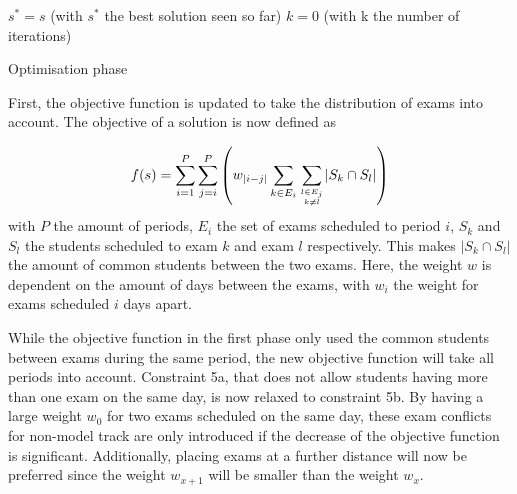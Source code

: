 \begin{algorithm}
 $s^* = s$ (with $s^*$ the best solution seen so far)\;
 $k = 0$ (with k the number of iterations)\;

\caption{Optimisation phase}
\label{alg:phase2}
\end{algorithm}


First, the objective function is updated to take the distribution of exams into account. The objective of a solution is now defined as

\begin{equation}
    f(s) = \sum_{i=1}^{P} \sum_{j=i}^{P}\left(w_{|i-j|} \sum_{k \in E_i}^{}\sum_{l \in E_j \atop k \neq l}^{} \lvert S_k \cap S_l \rvert\right)
\end{equation}
with $P$ the amount of periods, $E_i$ the set of exams scheduled to period $i$, $S_k$ and $S_l$ the students scheduled to exam $k$ and exam $l$ respectively. This makes $\lvert S_k \cap S_l \rvert$ the amount of common students between the two exams. Here, the weight $w$ is dependent on the amount of days between the exams, with $w_i$ the weight for exams scheduled $i$ days apart.

While the objective function in the first phase only used the common students between exams during the same period, the new objective function will take all periods into account. Constraint 5a, that does not allow students having more than one exam on the same day, is now relaxed to constraint 5b. By having a large weight $w_0$ for two exams scheduled on the same day, these exam conflicts for non-model track are only introduced if the decrease of the objective function is significant. Additionally, placing exams at a further distance will now be preferred since the weight $w_{x+1}$ will be smaller than the weight $w_x$.


